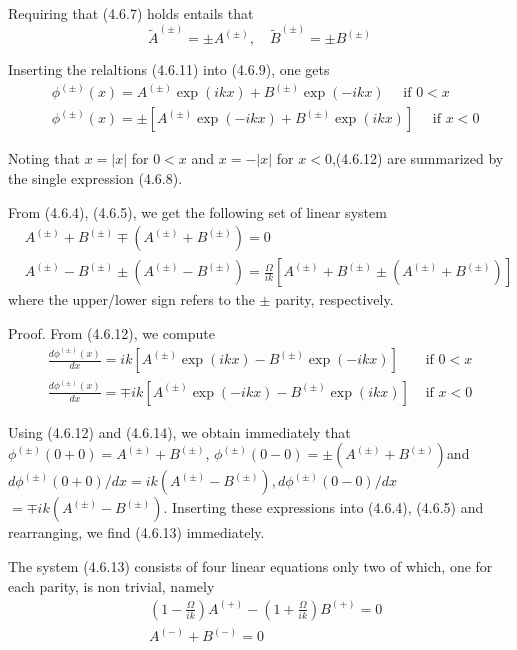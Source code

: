 \documentclass{article}
\begin{document}
Requiring that (4.6.7) holds entails that
$$
\begin{equation*}
\tilde{A}^{( \pm)}= \pm A^{( \pm)}, \quad \tilde{B}^{( \pm)}= \pm B^{( \pm)} \tag{4.6.11}
\end{equation*}
$$

Inserting the relaltions (4.6.11) into (4.6.9), one gets
$$
\begin{align*}
& \phi^{( \pm)}(x)=A^{( \pm)} \exp (i k x)+B^{( \pm)} \exp (-i k x) \quad \text { if } 0<x  \tag{4.6.12a}\\
& \phi^{( \pm)}(x)= \pm\left[A^{( \pm)} \exp (-i k x)+B^{( \pm)} \exp (i k x)\right] \quad \text { if } x<0 \tag{4.6.12b}
\end{align*}
$$

Noting that $x=|x|$ for $0<x$ and $x=-|x|$ for $x<0$,(4.6.12) are summarized by the single expression (4.6.8).

From (4.6.4), (4.6.5), we get the following set of linear system
$$
\begin{align*}
& A^{( \pm)}+B^{( \pm)} \mp\left(A^{( \pm)}+B^{( \pm)}\right)=0  \tag{4.6.13a}\\
& A^{( \pm)}-B^{( \pm)} \pm\left(A^{( \pm)}-B^{( \pm)}\right)=\frac{\Omega}{i k}\left[A^{( \pm)}+B^{( \pm)} \pm\left(A^{( \pm)}+B^{( \pm)}\right)\right] \tag{4.6.13b}
\end{align*}
$$
where the upper/lower sign refers to the $\pm$ parity, respectively.

Proof. From (4.6.12), we compute
$$
\begin{array}{ll}
\frac{d \phi^{( \pm)}(x)}{d x}=i k\left[A^{( \pm)} \exp (i k x)-B^{( \pm)} \exp (-i k x)\right] & \text { if } 0<x \\
\frac{d \phi^{( \pm)}(x)}{d x}=\mp i k\left[A^{( \pm)} \exp (-i k x)-B^{( \pm)} \exp (i k x)\right] & \text { if } x<0 \tag{4.6.14b}
\end{array}
$$

Using (4.6.12) and (4.6.14), we obtain immediately that $\phi^{( \pm)}(0+0)=A^{( \pm)}+B^{( \pm)}$, $\phi^{( \pm)}(0-0)= \pm\left(A^{( \pm)}+B^{( \pm)}\right)$and $d \phi^{( \pm)}(0+0) / d x=i k\left(A^{( \pm)}-B^{( \pm)}\right), d \phi^{( \pm)}(0-0) / d x$ $=\mp i k\left(A^{( \pm)}-B^{( \pm)}\right)$. Inserting these expressions into (4.6.4), (4.6.5) and rearranging, we find (4.6.13) immediately.

The system (4.6.13) consists of four linear equations only two of which, one for each parity, is non trivial, namely
$$
\begin{align*}
& \left(1-\frac{\Omega}{i k}\right) A^{(+)}-\left(1+\frac{\Omega}{i k}\right) B^{(+)}=0  \tag{4.6.15a}\\
& A^{(-)}+B^{(-)}=0 \tag{4.6.15b}
\end{align*}
$$
\end{document}
